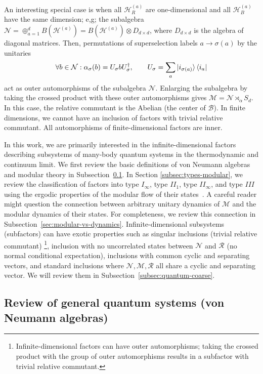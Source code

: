 \documentclass[a4paper,11pt]{article}
\theoremstyle{definition}
\newcommand{\mB}{\mathcal{B}}%
\newcommand{\mR}{\mathcal{R}}
\newcommand{\mN}{\mathcal{N}}
\newcommand{\mH}{\mathcal{H}}
\newcommand{\mM}{\mathcal{M}}
\begin{document}
An interesting special case is when all $\mH_R^{(a)}$ are one-dimensional and all $\mH_B^{(a)}$ have the same dimension; e,g; the subalgebra $\mN=\oplus_{a=1}^d B(\mH^{(a)})=B(\mH^{(a)})\otimes D_{d\times d}$, where $D_{d\times d}$ is the algebra of diagonal matrices. Then, permutations of superselection labels $a\to \sigma(a)$ by the unitaries
 \begin{align}
    \forall b\in\mN: \alpha_\sigma(b)=U_\sigma b U_\sigma^\dagger,\qquad U_{\sigma}=\sum_a \ket{i_{\sigma(a)}}\bra{i_a}
 \end{align}
act as outer automorphisms of the subalgebra $\mN$.
Enlarging the subalgebra by taking the crossed product with these outer automorphisms gives $\mM=\mN\rtimes_\alpha S_d$. In this case, the relative commutant is the Abelian (the center of $\mB$). In finite dimensions, we cannot have an inclusion of factors with trivial relative commutant. All automorphisms of finite-dimensional factors are inner.


In this work, we are primarily interested in the infinite-dimensional factors describing subsystems of many-body quantum systems in the thermodynamic and continuum limit. We first review the basic definitions of von Neumann algebras and modular theory in Subsection~\ref{app:vN}. In Section \ref{subsec:types-modular}, we review the classification of factors into type $I_\infty$, type $II_1$, type $II_\infty$, and type $III$ using the ergodic properties of the modular flow of their states~\cite{Takesaki1970,Connes1973}. A careful reader might question the connection between arbitrary unitary dynamics of $\mM$ and the modular dynamics of their states. For completeness, we review this connection in  Subsection~\ref{sec:modular-vs-dynamics}. Infinite-dimensional subsystems (subfactors) can have exotic properties such as singular inclusions (trivial relative commutant) \footnote{Infinite-dimensional factors can have outer automorphisms; taking the crossed product with the group of outer automorphisms results in a subfactor with trivial relative commutant.}, inclusion with no uncorrelated states between $\mN$ and $\mR$ (no normal conditional expectation), inclusions with common cyclic and separating vectors, and standard inclusions where $\mN,\mM,\mR$ all share a cyclic and separating vector. We will review them in Subsection~\ref{subsec:quantum-coarse}.

\subsection{Review of general quantum systems (von Neumann algebras)}\label{app:vN}
\end{document}
